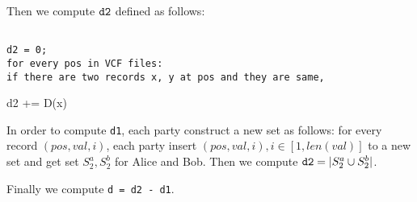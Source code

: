 Then we compute ${\tt d2}$ defined as follows:
\begin{framed}
{\tt~\\
d2 = 0;\\
for every pos in VCF files:\\
if there are two records x, y at pos and they are same,

d2 += D(x)\\}
\end{framed}
In order to compute {\tt d1}, each party construct a new set as follows:  for every record $(pos, val, i)$,
each party insert $(pos, val, i), i\in[1, len(val)]$ to a new set and get set $S_2^a, S_2^b$ for Alice and Bob. Then we compute
${\tt d2} = |S_2^a\cup S_2^b|$.


Finally we compute {\tt d = d2 - d1}.